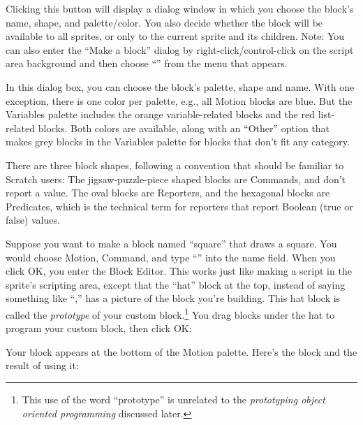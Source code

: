 \documentclass{report}
\begin{document}
Clicking this button will display a dialog window in which you choose the block's name, shape, and palette/color. You also decide whether the block will be available to all sprites, or only to the current sprite and its children. Note: You can also enter the ``Make a block'' dialog by right-click/control-click on the script area background and then choose ``'' from the menu that appears.


In this dialog box, you can choose the block's palette, shape and name. With one exception, there is one color per palette, e.g., all Motion blocks are blue. But the Variables palette includes the orange variable-related blocks and the red list-related blocks. Both colors are available, along with an ``Other'' option that makes grey blocks in the Variables palette for blocks that don't fit any category.

There are three block shapes, following a convention that should be familiar to Scratch users: The jigsaw-puzzle-piece shaped blocks are Commands, and don't report a value. The oval blocks are Reporters, and the hexagonal blocks are Predicates, which is the technical term for reporters that report Boolean (true or false) values.

Suppose you want to make a block named ``square'' that draws a square. You would choose Motion, Command, and type ``'' into the name field. When you click OK, you enter the Block Editor. This works just like making a script in the sprite's scripting area, except that the ``hat'' block at the top, instead of saying something like ``,'' has a picture of the block you're building. This hat block is called the \emph{prototype} of your custom block.\footnote{This use of the word ``prototype'' is unrelated to the \emph{prototyping object oriented programming} discussed later.} You drag blocks under the hat to program your custom block, then click OK:\nopagebreak


Your block appears at the bottom of the Motion palette. Here's the block and the result of using it:\nopagebreak
\end{document}
